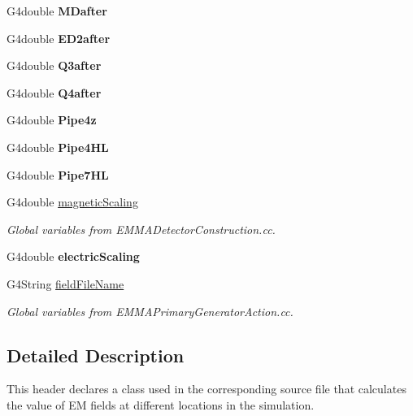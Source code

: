 \begin{DoxyCompactItemize}
\item 
\hypertarget{EMFieldDebugger_8hh_af04f7784a3cdd89375e6c74b915d255c}{G4double {\bfseries M\-Dafter}}\label{EMFieldDebugger_8hh_af04f7784a3cdd89375e6c74b915d255c}

\item 
\hypertarget{EMFieldDebugger_8hh_ad4c429af59f2e7eee31d1480df299599}{G4double {\bfseries E\-D2after}}\label{EMFieldDebugger_8hh_ad4c429af59f2e7eee31d1480df299599}

\item 
\hypertarget{EMFieldDebugger_8hh_a7a55e4b1397f5859cde14aa271bb3717}{G4double {\bfseries Q3after}}\label{EMFieldDebugger_8hh_a7a55e4b1397f5859cde14aa271bb3717}

\item 
\hypertarget{EMFieldDebugger_8hh_a47d7897cbc13a67cc420cfb3ec97fd60}{G4double {\bfseries Q4after}}\label{EMFieldDebugger_8hh_a47d7897cbc13a67cc420cfb3ec97fd60}

\item 
\hypertarget{EMFieldDebugger_8hh_a58acf77da23d6d58252d729d4d8212d1}{G4double {\bfseries Pipe4z}}\label{EMFieldDebugger_8hh_a58acf77da23d6d58252d729d4d8212d1}

\item 
\hypertarget{EMFieldDebugger_8hh_ab20b3e8fa2797e410fb9110cfad39796}{G4double {\bfseries Pipe4\-H\-L}}\label{EMFieldDebugger_8hh_ab20b3e8fa2797e410fb9110cfad39796}

\item 
\hypertarget{EMFieldDebugger_8hh_a7369eeb2c228d92eeb2a6e7ad496e13f}{G4double {\bfseries Pipe7\-H\-L}}\label{EMFieldDebugger_8hh_a7369eeb2c228d92eeb2a6e7ad496e13f}

\item 
\hypertarget{EMFieldDebugger_8hh_aeb29decdede3d925164d390a2bf4a67a}{G4double \hyperlink{EMFieldDebugger_8hh_aeb29decdede3d925164d390a2bf4a67a}{magnetic\-Scaling}}\label{EMFieldDebugger_8hh_aeb29decdede3d925164d390a2bf4a67a}

\begin{DoxyCompactList}\small\item\em Global variables from E\-M\-M\-A\-Detector\-Construction.\-cc. \end{DoxyCompactList}\item 
\hypertarget{EMFieldDebugger_8hh_a528ee0b2618db44ed7b0734789834f3d}{G4double {\bfseries electric\-Scaling}}\label{EMFieldDebugger_8hh_a528ee0b2618db44ed7b0734789834f3d}

\item 
\hypertarget{EMFieldDebugger_8hh_ae9b14cfeccc31b1bf76af2f4c3aae43d}{G4\-String \hyperlink{EMFieldDebugger_8hh_ae9b14cfeccc31b1bf76af2f4c3aae43d}{field\-File\-Name}}\label{EMFieldDebugger_8hh_ae9b14cfeccc31b1bf76af2f4c3aae43d}

\begin{DoxyCompactList}\small\item\em Global variables from E\-M\-M\-A\-Primary\-Generator\-Action.\-cc. \end{DoxyCompactList}\end{DoxyCompactItemize}


\subsection{Detailed Description}
This header declares a class used in the corresponding source file that calculates the value of E\-M fields at different locations in the simulation. 